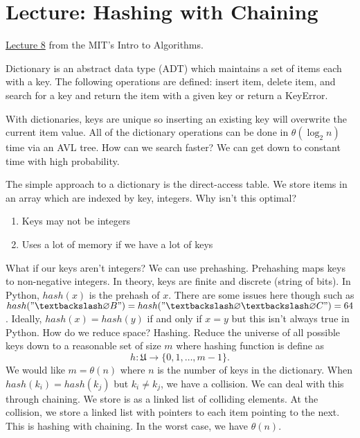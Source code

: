 \chapter{Lecture: Hashing with Chaining}
\href{https://ocw.mit.edu/courses/electrical-engineering-and-computer-science/6-006-introduction-to-algorithms-fall-2011/lecture-videos/lecture-8-hashing-with-chaining/}{Lecture 8} 
from the MIT's  Intro to Algorithms.

\begin{definition}
	Dictionary is an abstract data type (ADT) which maintains a set of items each with a key. The following
	operations are defined: insert item, delete item, and search for a key and return the item with a given key
	or return a KeyError.
\end{definition}
\noindent
With dictionaries, keys are unique so inserting an existing key will overwrite the current item value. All of the
dictionary operations can be done in \(\theta(\log_2 n)\) time via an AVL tree. How can we search faster?
We can get down to constant time with high probability.

The simple approach to a dictionary is the direct-access table. We store items in an array which are indexed
by key, integers. Why isn't this optimal?
\begin{enumerate}
	\item Keys may not be integers
	\item Uses a lot of memory if we have a lot of keys
\end{enumerate}
What if our keys aren't integers? We can use prehashing. Prehashing maps keys to non-negative integers.
In theory, keys are finite and discrete (string of bits). In Python, \(hash(x)\) is the prehash of \(x\). There are 
some issues here though such as 
\(hash("\textbackslash\varnothing B") = hash("\textbackslash\varnothing\textbackslash\varnothing C") = 64\).
Ideally, \(hash(x) = hash(y)\) if and only if \(x = y\) but this isn't always true in Python. How do we reduce 
space? Hashing. Reduce the universe of all possible keys down to a reasonable set of size \(m\) where 
hashing function is define as
\[
	h:\mathfrak{U}\rightarrow \big\{0, 1, \ldots, m - 1\big\}.
\]
We would like \(m = \theta(n)\) where \(n\) is the number of keys in the dictionary. When 
\(hash(k_i) = hash(k_j)\) but \(k_i \neq k_j\), we have a collision. We can deal with this through chaining. 
We store is as a linked list of colliding elements. At the collision, we store a linked list with pointers to each 
item pointing to the next. This is hashing with chaining. In the worst case, we have \(\theta(n)\).

